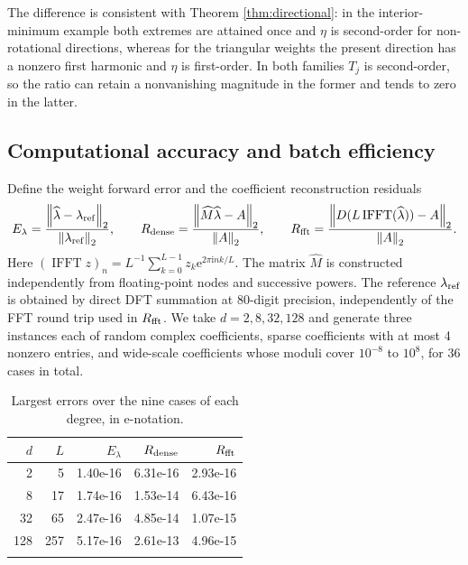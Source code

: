 \documentclass[10pt,twoside,final]{siamart1116}
\numberwithin{equation}{section}
\numberwithin{theorem}{section}
\newcommand{\norm}[1]{\left\lVert#1\right\rVert_2}
\newcommand{\e}{\mathrm e}
\newcommand{\ii}{\mathrm i}
\begin{document}
The difference is consistent with Theorem \ref{thm:directional}: in the interior-minimum
example both extremes are attained once and $\eta$ is second-order for non-rotational
directions, whereas for the triangular weights the present direction has a nonzero first
harmonic and $\eta$ is first-order. In both families $T_j$ is second-order, so the ratio
can retain a nonvanishing magnitude in the former and tends to zero in the latter.

\subsection{Computational accuracy and batch efficiency}

Define the weight forward error and the coefficient reconstruction residuals
\begin{equation}\label{eq:metrics}
E_\lambda=\frac{\norm{\widehat\lambda-\lambda_{\rm ref}}}{\norm{\lambda_{\rm ref}}},\qquad
R_{\rm dense}=\frac{\norm{\widehat M\widehat\lambda-A}}{\norm A},\qquad
R_{\rm fft}=\frac{\norm{D(L\operatorname{IFFT}(\widehat\lambda))-A}}{\norm A}.
\end{equation}
Here $(\operatorname{IFFT}z)_n=L^{-1}\sum_{k=0}^{L-1}z_k\e^{2\pi\ii nk/L}$.
The matrix $\widehat M$ is constructed independently from floating-point nodes and
successive powers. The reference $\lambda_{\rm ref}$ is obtained by direct DFT
summation at 80-digit precision, independently of the FFT round trip used in
$R_{\rm fft}$. We take $d=2,8,32,128$ and generate three instances
each of random complex coefficients, sparse coefficients with at most 4 nonzero entries,
and wide-scale coefficients whose moduli cover $10^{-8}$ to $10^8$, for 36 cases in
total.

\begin{table}[htbp]\centering\small
\caption{Largest errors over the nine cases of each degree, in e-notation.}\label{tab:accuracy}
\begin{tabular}{rrrrr}\toprule
$d$ & $L$ & $E_\lambda$ & $R_{\rm dense}$ & $R_{\rm fft}$\\\midrule
2 & 5 & 1.40e-16 & 6.31e-16 & 2.93e-16 \\
8 & 17 & 1.74e-16 & 1.53e-14 & 6.43e-16 \\
32 & 65 & 2.47e-16 & 4.85e-14 & 1.07e-15 \\
128 & 257 & 5.17e-16 & 2.61e-13 & 4.96e-15 \\
\\[-.8em]\bottomrule\end{tabular}
\end{table}
\end{document}
